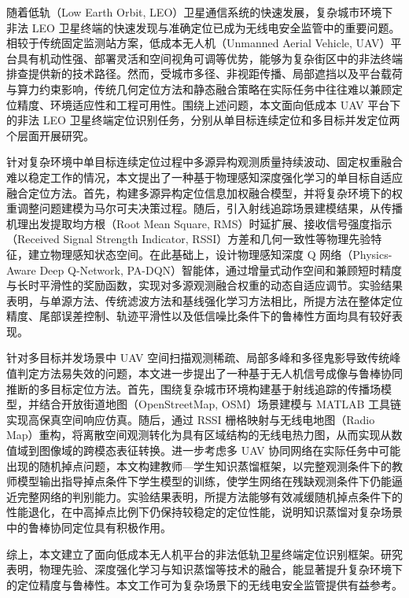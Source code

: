 \begin{cnabstract}
随着低轨（Low Earth Orbit, LEO）卫星通信系统的快速发展，复杂城市环境下非法 LEO 卫星终端的快速发现与准确定位已成为无线电安全监管中的重要问题。相较于传统固定监测站方案，低成本无人机（Unmanned Aerial Vehicle, UAV）平台具有机动性强、部署灵活和空间视角可调等优势，能够为复杂街区中的非法终端排查提供新的技术路径。然而，受城市多径、非视距传播、局部遮挡以及平台载荷与算力约束影响，传统几何定位方法和静态融合策略在实际任务中往往难以兼顾定位精度、环境适应性和工程可用性。围绕上述问题，本文面向低成本 UAV 平台下的非法 LEO 卫星终端定位识别任务，分别从单目标连续定位和多目标并发定位两个层面开展研究。

针对复杂环境中单目标连续定位过程中多源异构观测质量持续波动、固定权重融合难以稳定工作的情况，本文提出了一种基于物理感知深度强化学习的单目标自适应融合定位方法。首先，构建多源异构定位信息加权融合模型，并将复杂环境下的权重调整问题建模为马尔可夫决策过程。随后，引入射线追踪场景建模结果，从传播机理出发提取均方根（Root Mean Square, RMS）时延扩展、接收信号强度指示（Received Signal Strength Indicator, RSSI）方差和几何一致性等物理先验特征，建立物理感知状态空间。在此基础上，设计物理感知深度 Q 网络（Physics-Aware Deep Q-Network, PA-DQN）智能体，通过增量式动作空间和兼顾短时精度与长时平滑性的奖励函数，实现对多源观测融合权重的动态自适应调节。实验结果表明，与单源方法、传统滤波方法和基线强化学习方法相比，所提方法在整体定位精度、尾部误差控制、轨迹平滑性以及低信噪比条件下的鲁棒性方面均具有较好表现。

针对多目标并发场景中 UAV 空间扫描观测稀疏、局部多峰和多径鬼影导致传统峰值判定方法易失效的问题，本文进一步提出了一种基于无人机信号成像与鲁棒协同推断的多目标定位方法。首先，围绕复杂城市环境构建基于射线追踪的传播场模型，并结合开放街道地图（OpenStreetMap, OSM）场景建模与 MATLAB 工具链实现高保真空间响应仿真。随后，通过 RSSI 栅格映射与无线电地图（Radio Map）重构，将离散空间观测转化为具有区域结构的无线电热力图，从而实现从数值域到图像域的跨模态表征转换。进一步考虑多 UAV 协同网络在实际任务中可能出现的随机掉点问题，本文构建教师—学生知识蒸馏框架，以完整观测条件下的教师模型输出指导掉点条件下学生模型的训练，使学生网络在残缺观测条件下仍能逼近完整网络的判别能力。实验结果表明，所提方法能够有效减缓随机掉点条件下的性能退化，在中高掉点比例下仍保持较稳定的定位性能，说明知识蒸馏对复杂场景中的鲁棒协同定位具有积极作用。

综上，本文建立了面向低成本无人机平台的非法低轨卫星终端定位识别框架。研究表明，物理先验、深度强化学习与知识蒸馏等技术的融合，能显著提升复杂环境下的定位精度与鲁棒性。本文工作可为复杂场景下的无线电安全监管提供有益参考。

\end{cnabstract}